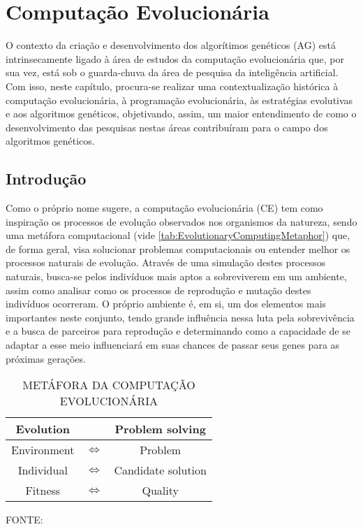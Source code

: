 \chapter{Computação Evolucionária}

O contexto da criação e desenvolvimento dos algorítimos genéticos (AG) está intrinsecamente ligado à área de estudos da computação evolucionária que, por sua vez, está sob o guarda-chuva da área de pesquisa da inteligência artificial. Com isso, neste capítulo, procura-se realizar uma contextualização histórica à computação evolucionária, à programação evolucionária, às estratégias evolutivas e aos algoritmos genéticos, objetivando, assim, um maior entendimento de como o desenvolvimento das pesquisas nestas áreas contribuíram para o campo dos algoritmos genéticos.

\section{Introdução}

Como o próprio nome sugere, a computação evolucionária (CE) tem como inspiração os processos de evolução observados nos organismos da natureza, sendo uma metáfora computacional (vide \autoref{tab:EvolutionaryComputingMetaphor}) que, de forma geral, visa solucionar problemas computacionais ou entender melhor os processos naturais de evolução. Através de uma simulação destes processos naturais, busca-se pelos indivíduos mais aptos a sobreviverem em um ambiente, assim como analisar como os processos de reprodução e mutação destes indivíduos ocorreram. O próprio ambiente é, em si, um dos elementos mais importantes neste conjunto, tendo grande influência nessa luta pela sobrevivência e a busca de parceiros para reprodução e determinando como a capacidade de se adaptar a esse meio influenciará em suas chances de passar seus genes para as próximas gerações.

\begin{table}[H]
	\caption{\uppercase{Metáfora da Computação Evolucionária}}
	\small
	\centering
	\vspace{2pt}
	\def\arraystretch{1.2}
	\begin{tabular}{ |ccc| }
		\hline
		Evolution & ~ & Problem solving \\ \hline
		Environment & $\Longleftrightarrow$ & Problem \\
		Individual & $\Longleftrightarrow$ & Candidate solution \\
		Fitness & $\Longleftrightarrow$ & Quality \\ \hline
	\end{tabular}
	\label{tab:EvolutionaryComputingMetaphor}
	\begin{minipage}{1 \textwidth}
		\centering
		\vspace{6pt}
		FONTE:~\cite{eiben_introduction_2015}
	\end{minipage}
\end{table}

